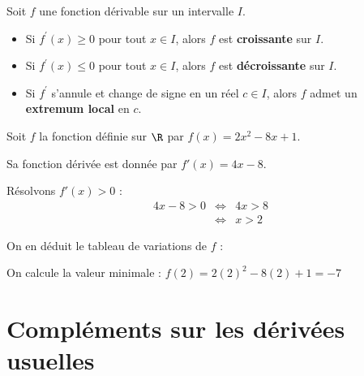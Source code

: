 \begin{prop}
	Soit $f$ une fonction dérivable sur un intervalle $I$.
	\begin{itemize}
		\item Si $f^\prime(x) \geq 0$ pour tout $x \in I$, alors $f$ est \textbf{croissante} sur $I$.
		\item Si $f^\prime(x) \leq 0$ pour tout $x \in I$, alors $f$ est \textbf{décroissante} sur $I$.
		\item Si $f^\prime$ s'annule et change de signe en un réel $c \in I$, alors $f$ admet un \textbf{extremum local} en $c$.
	\end{itemize}
\end{prop}

\begin{ex}
	Soit $f$ la fonction définie sur $\R$ par $f(x) = 2x^2 - 8x + 1$.

	Sa fonction dérivée est donnée par $f'(x) = 4x - 8$.

	Résolvons $f'(x) > 0$ :
	\[
		\begin{array}{rcl}
			4x - 8 > 0 & \iff & 4x > 8 \\
			           & \iff & x > 2
		\end{array}
	\]

	On en déduit le tableau de variations de $f$ :

	\begin{center}
	\end{center}

	On calcule la valeur minimale : $f(2) = 2(2)^2 - 8(2) + 1 = -7$
\end{ex}
\section{Compléments sur les dérivées usuelles}

